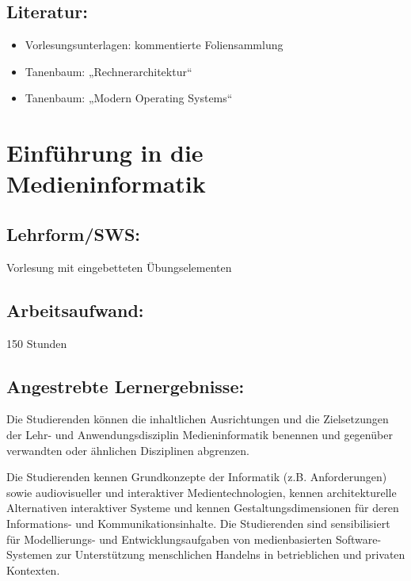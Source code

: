 \section{Literatur:}\label{literatur-8}

\begin{itemize}
\tightlist
\item
  Vorlesungsunterlagen: kommentierte Foliensammlung
\item
  Tanenbaum: „Rechnerarchitektur``
\item
  Tanenbaum: „Modern Operating Systems``
\end{itemize}

\chapter{Einführung in die
Medieninformatik}\label{einfuxfchrung-in-die-medieninformatik}

\section{Lehrform/SWS:}\label{lehrformsws-9}

Vorlesung mit eingebetteten Übungselementen

\section{Arbeitsaufwand:}\label{arbeitsaufwand-9}

150 Stunden

\section{Angestrebte
Lernergebnisse:}\label{angestrebte-lernergebnisse-9}

Die Studierenden können die inhaltlichen Ausrichtungen und die
Zielsetzungen der Lehr- und Anwendungsdisziplin Medieninformatik
benennen und gegenüber verwandten oder ähnlichen Disziplinen abgrenzen.

Die Studierenden kennen Grundkonzepte der Informatik (z.B.
Anforderungen) sowie audiovisueller und interaktiver Medientechnologien,
kennen architekturelle Alternativen interaktiver Systeme und kennen
Gestaltungsdimensionen für deren Informations- und
Kommunikationsinhalte. Die Studierenden sind sensibilisiert für
Modellierungs- und Entwicklungsaufgaben von medienbasierten
Software-Systemen zur Unterstützung menschlichen Handelns in
betrieblichen und privaten Kontexten.

